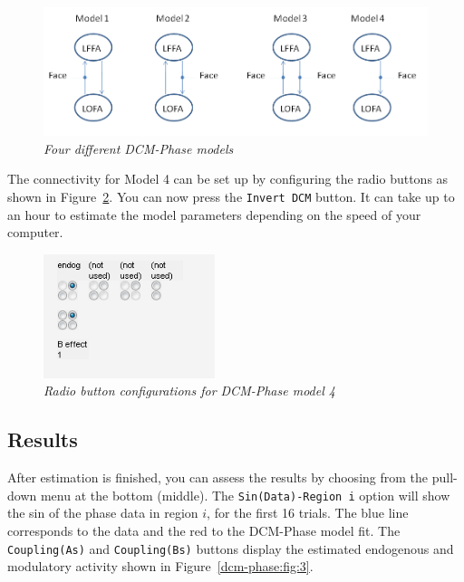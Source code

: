 \begin{figure}
\begin{center}
\includegraphics[width=160mm]{multimodal/figures/phase-models}
\caption{\em Four different DCM-Phase models  \label{dcm-phase:fig:1}}
\end{center}
\end{figure}

The connectivity for Model 4 can be set up by configuring the radio buttons as shown in Figure~\ref{dcm-phase:fig:2}. You can now press the \texttt{Invert DCM} button. It can take up to an hour to estimate the model parameters depending on the speed of your computer.

\begin{figure}
\begin{center}
\includegraphics[width=50mm]{multimodal/figures/model4_conn}
\caption{\em Radio button configurations for DCM-Phase model 4  \label{dcm-phase:fig:2}}
\end{center}
\end{figure}

\subsection{Results}

After estimation is finished, you can assess the results by choosing from the pull-down menu at the bottom (middle). The \texttt{Sin(Data)-Region i} option will show the sin of the phase data in region $i$, for the first 16 trials. The blue line corresponds to the data and the red to the DCM-Phase model fit. The 
\texttt{Coupling(As)} and \texttt{Coupling(Bs)} buttons display the estimated endogenous and modulatory activity shown in Figure~\ref{dcm-phase:fig:3}.

